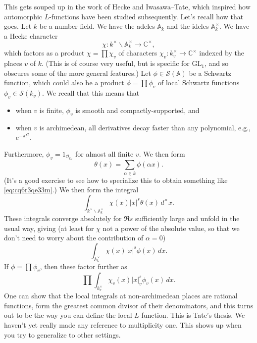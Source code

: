 \documentclass[reqno]{amsart} 
\begin{document}
This gets souped up in the work of Hecke and Iwasawa--Tate, which inspired how automorphic $L$-functions have been studied subsequently.  Let's recall how that goes.  Let $k$ be a number field.  We have the adeles $\mathbb{A}_k$ and the ideles $\mathbb{A}_k^\times$.  We have a Hecke character
\begin{equation*}
  \chi : k^\times \backslash \mathbb{A}_k^\times \rightarrow \mathbb{C}^\times,
\end{equation*}
which factors as a product $\chi = \prod \chi_v$ of characters $\chi_v : k_v^\times \rightarrow \mathbb{C}^\times$ indexed by the places $v$ of $k$.  (This is of course very useful, but is specific for $\mathrm{GL}_1$, and so obscures some of the more general features.)  Let $\phi \in \mathcal{S}(\mathbb{A})$ be a Schwartz function, which could also be a product $\phi = \prod \phi_v$ of local Schwartz functions $\phi_v \in \mathcal{S}(k_v)$.  We recall that this means that
\begin{itemize}
\item when $v$ is finite, $\phi_v$ is smooth and compactly-supported, and
\item when $v$ is archimedean, all derivatives decay faster than any polynomial, e.g., $e^{- \pi t^2}$.
\end{itemize}
Furthermore, $\phi_v = 1_{\mathcal{O}_{k_v}}$ for almost all finite $v$.  We then form
\begin{equation*}
  \theta(x) = \sum_{\alpha \in k} \phi(\alpha x).
\end{equation*}
(It's a good exercise to see how to specialize this to obtain something like \eqref{eq:cq6r3qe33m}.)  We then form the integral
\begin{equation*}
  \int_{k^\times \backslash \mathbb{A}_k^\times} \chi(x) \lvert x \rvert^s \theta(x) \,d^\times x.
\end{equation*}
These integrals converge absolutely for $\Re s$ sufficiently large and unfold in the usual way, giving
(at least for $\chi$ not a power of the absolute value, so that we don't need to worry about the contribution of $\alpha = 0$)
\begin{equation*}
  \int_{\mathbb{A}_k^\times} \chi(x) \lvert x \rvert^s \phi(x) \, d x.
\end{equation*}
If $\phi = \prod \phi_v$, then these factor further as
\begin{equation}\label{eq:cq6r32qpe5}
  \prod \int_{k_v^\times} \chi_v(x) \lvert x \rvert_v^s \phi_v(x) \, d x.
\end{equation}
One can show that the local integrals at non-archimedean places are rational functions, form the greatest common divisor of their denominators, and this turns out to be the way you can define the local $L$-function.  This is Tate's thesis.  We haven't yet really made any reference to multiplicity one.  This shows up when you try to generalize to other settings.
\end{document}
